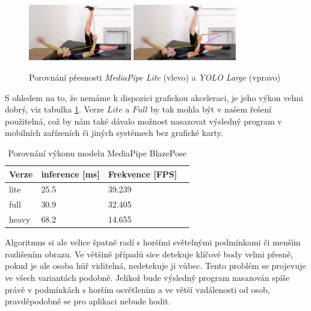 \begin{figure}
    \centering
    \includegraphics[width=0.4\textwidth]{Figures/pose_tests/mh1.png}
    \includegraphics[width=0.4\textwidth]{Figures/pose_tests/yl1.png}
    \caption{Porovnání přesnosti \textit{MediaPipe Lite} (vlevo) a \textit{YOLO Large} (vpravo)}
    \label{fig:ym_comparison}
\end{figure}

S ohledem na to, že nemáme k dispozici grafickou akceleraci, je jeho výkon
velmi dobrý, viz tabulka \ref{tab:mediapipe_performance}. Verze $Lite$ a $Full$
by tak mohla být v našem řešení použitelná, což by nám také dávalo možnost
nasazovat výsledný program v mobilních zařízeních či jiných systémech bez
grafické karty.

\begin{table}[htbp]
    \centering
    \caption{Porovnání výkonu modelu MediaPipe BlazePose}
    \label{tab:mediapipe_performance}
    \begin{tabular}{|l|l|l|l|}
        \hline
        \textbf{Verze} & \textbf{inference [ms]} & \textbf{Frekvence [FPS]} \\
        \hline
        lite           & 25.5                    & 39.239                   \\ \hline
        full           & 30.9                    & 32.405                   \\ \hline
        heavy          & 68.2                    & 14.655                   \\ \hline
    \end{tabular}
\end{table}

Algoritmus si ale velice špatně radí s horšími světelnými podmínkami či menším
rozlišením obrazu. Ve většině případů sice detekuje klíčové body velmi přesně,
pokud je ale osoba hůř viditelná, nedetekuje ji vůbec. Tento problém se
projevuje ve všech variantách podobně. Jelikož bude výsledný program nasazován
spíše právě v podmínkách s horším osvětlením a ve větší vzdálenosti od osob,
pravděpodobně se pro aplikaci nebude hodit.

